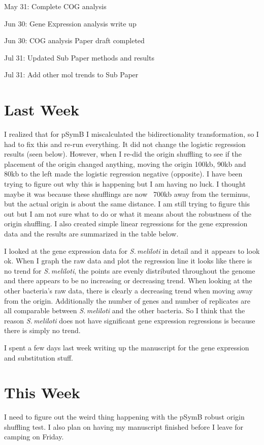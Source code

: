 \documentclass[12pt]{article}
\newcommand{\smel}{\textit{S.\,meliloti}\xspace}
\newcommand{\pb}{pSymB\xspace}
\begin{document}
	May 31:	Complete COG analysis
	
	Jun 30:	Gene Expression analysis write up
	
	Jun 30:	COG analysis Paper draft completed
	
	Jul 31:	Updated Sub Paper methods and results
	
	Jul 31: Add other mol trends to Sub Paper
	
\section*{Last Week}
I realized that for \pb I miscalculated the bidirectionality transformation, so I had to fix this and re-run everything.
It did not change the logistic regression results (seen below).
However, when I re-did the origin shuffling to see if the placement of the origin changed anything, moving the origin 100kb, 90kb and 80kb to the left made the logistic regression negative (opposite). I have been trying to figure out why this is happening but I am having no luck. I thought maybe it was because these shufflings are now ~700kb away from the terminus, but the actual origin is about the same distance. I am still trying to figure this out but I am not sure what to do or what it means about the robustness of the origin shuffling.
I also created simple linear regressions for the gene expression data and the results are summarized in the table below.

I looked at the gene expression data for \smel in detail and it appears to look ok.
When I graph the raw data and plot the regression line it looks like there is no trend for \smel, the points are evenly distributed throughout the genome and there appears to be no increasing or decreasing trend.
When looking at the other bacteria's raw data, there is clearly a decreasing trend when moving away from the origin.
Additionally the number of genes and number of replicates are all comparable between \smel and the other bacteria.
So I think that the reason \smel does not have significant gene expression regressions is because there is simply no trend.

I spent a few days last week writing up the manuscript for the gene expression and substitution stuff.

\section*{This Week}
I need to figure out the weird thing happening with the \pb robust origin shuffling test.
I also plan on having my manuscript finished before I leave for camping on Friday.
\end{document}
